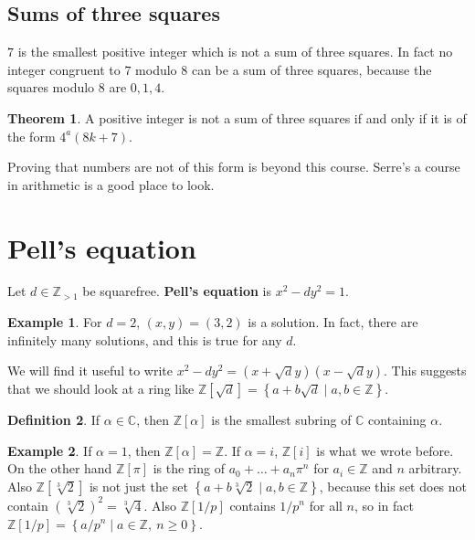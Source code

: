 \documentclass{article}
\newcommand{\Z}{\mathbb{Z}}
\newcommand{\C}{\mathbb{C}}
\newcommand{\rb}[1]{\left( #1 \right)}
\renewcommand{\sb}[1]{\left[ #1 \right]}
\newcommand{\cb}[1]{\left\{ #1 \right\}}
\theoremstyle{definition}\newtheorem{definition}{Definition}
\theoremstyle{definition}\newtheorem*{remark}{Remark}
\theoremstyle{definition}\newtheorem*{example}{Example}
\theoremstyle{definition}\newtheorem*{note}{Note}
\newtheorem{theorem}[definition]{Theorem}
\begin{document}
\subsection{Sums of three squares}

$ 7 $ is the smallest positive integer which is not a sum of three squares. In fact no integer congruent to $ 7 $ modulo $ 8 $ can be a sum of three squares, because the squares modulo $ 8 $ are $ 0, 1, 4 $.

\begin{theorem}
A positive integer is not a sum of three squares if and only if it is of the form $ 4^a\rb{8k + 7} $.
\end{theorem}

Proving that numbers are not of this form is beyond this course. Serre's a course in arithmetic is a good place to look.

\section{Pell's equation}

Let $ d \in \Z_{> 1} $ be squarefree. \textbf{Pell's equation} is $ x^2 - dy^2 = 1 $.

\begin{example}
For $ d = 2 $, $ \rb{x, y} = \rb{3, 2} $ is a solution. In fact, there are infinitely many solutions, and this is true for any $ d $.
\end{example}

We will find it useful to write $ x^2 - dy^2 = \rb{x + \sqrt{d}y}\rb{x - \sqrt{d}y} $. This suggests that we should look at a ring like $ \Z\sb{\sqrt{d}} = \cb{a + b\sqrt{d} \mid a, b \in \Z} $.

\begin{definition}
If $ \alpha \in \C $, then $ \Z\sb{\alpha} $ is the smallest subring of $ \C $ containing $ \alpha $.
\end{definition}

\begin{example}
If $ \alpha = 1 $, then $ \Z\sb{\alpha} = \Z $. If $ \alpha = i $, $ \Z\sb{i} $ is what we wrote before. On the other hand $ \Z\sb{\pi} $ is the ring of $ a_0 + \dots + a_n\pi^n $ for $ a_i \in \Z $ and $ n $ arbitrary. Also $ \Z\sb{\sqrt[3]{2}} $ is not just the set $ \cb{a + b\sqrt[3]{2} \mid a, b \in \Z} $, because this set does not contain $ \rb{\sqrt[3]{2}}^2 = \sqrt[3]{4} $. Also $ \Z\sb{1 / p} $ contains $ 1 / p^n $ for all $ n $, so in fact $ \Z\sb{1 / p} = \cb{a / p^n \mid a \in \Z, \ n \ge 0} $.
\end{example}
\end{document}
